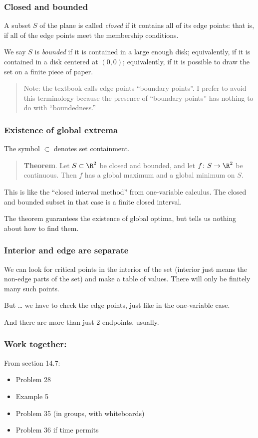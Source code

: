 \documentclass[11pt,ignorenonframetext,aspectratio=169,xcolor={svgnames}]{beamer}
\begin{document}
\begin{frame}\frametitle{Closed and bounded}

A subset $S$ of the plane is called \emph{closed} if it contains all of
its edge points: that is, if all of the edge points meet the membership
conditions.

We say $S$ is \emph{bounded} if it is contained in a large enough disk;
equivalently, if it is contained in a disk centered at $(0,0)$;
equivalently, if it is possible to draw the set on a finite piece of
paper.

\begin{quote}
Note: the textbook calls edge points ``boundary points''. I prefer to
avoid this terminology because the presence of ``boundary points'' has
nothing to do with ``boundedness.''
\end{quote}

\end{frame}

\begin{frame}\frametitle{Existence of global extrema}

The symbol $\subset$ denotes set containment.

\begin{quote}
\textbf{Theorem}. Let $S \subset \R^2$ be closed and bounded, and let
$f \colon S \to \R^2$ be continuous. Then $f$ has a global maximum and a
global minimum on $S$.
\end{quote}

This is like the ``closed interval method'' from one-variable calculus.
The closed and bounded subset in that case is a finite closed interval.

The theorem guarantees the existence of global optima, but tells us
nothing about how to find them.

\end{frame}

\begin{frame}\frametitle{Interior and edge are separate}

We can look for critical points in the interior of the set (interior
just means the non-edge parts of the set) and make a table of values.
There will only be finitely many such points.

But \ldots{} we have to check the edge points, just like in the
one-variable case.

And there are more than just 2 endpoints, usually.

\end{frame}

\begin{frame}\frametitle{Work together:}

From section 14.7:

\begin{itemize}

\item
  Problem 28
\item
  Example 5
\item
  Problem 35 (in groups, with whiteboards)
\item
  Problem 36 if time permits
\end{itemize}

\end{frame}
\end{document}
